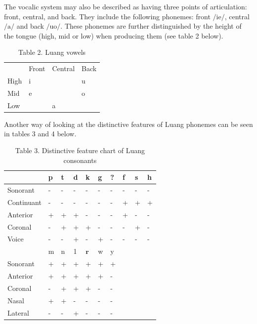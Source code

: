 \documentclass[10pt]{article}
\begin{document}
The vocalic system may also be described as having three points of articulation: front, central, and back. They include the following phonemes: front \(/ \mathrm{i} \mathrm{e} /\), central \(/ \mathrm{a} /\) and back \(/ \mathrm{u} \mathrm{o} /\). These phonemes are further distinguished by the height of the tongue (high, mid or low) when producing them (see table 2 below).

\begin{table}[h]
\begin{center}
\captionsetup{labelformat=empty}
\caption{Table 2. Luang vowels}
\begin{tabular}{|llll|}
\hline
 & Front & Central & Back \\
High & i &  & u \\
Mid & e &  & o \\
Low &  & a &  \\
\hline
\end{tabular}
\end{center}
\end{table}

Another way of looking at the distinctive features of Luang phonemes can be seen in tables 3 and 4 below.

\begin{table}[h]
\begin{center}
\captionsetup{labelformat=empty}
\caption{Table 3. Distinctive feature chart of Luang consonants}
\begin{tabular}{|l|l|l|l|l|l|l|l|l|l|}
\hline
 & p & t & d & k & g & ? & f & s & h \\
\hline
Sonorant & - & - & - & - & - & - & - & - & - \\
\hline
Continuant & - & - & - & - & - & - & + & + & + \\
\hline
Anterior & + & + & + & - & - & - & + & - & - \\
\hline
Coronal & - & + & + & + & - & - & - & + & - \\
\hline
Voice & - & - & + & - & + & - & - & - & - \\
\hline
 & m & n & 1 & \(\mathbf{r}\) & w & y &  &  &  \\
\hline
Sonorant & + & + & + & + & + & + &  &  &  \\
\hline
Anterior & + & + & + & + & + & - &  &  &  \\
\hline
Coronal & - & + & + & + & - & - &  &  &  \\
\hline
Nasal & + & + & - & - & - & - &  &  &  \\
\hline
Lateral & - & - & + & - & - & - &  &  &  \\
\hline
\end{tabular}
\end{center}
\end{table}
\end{document}
